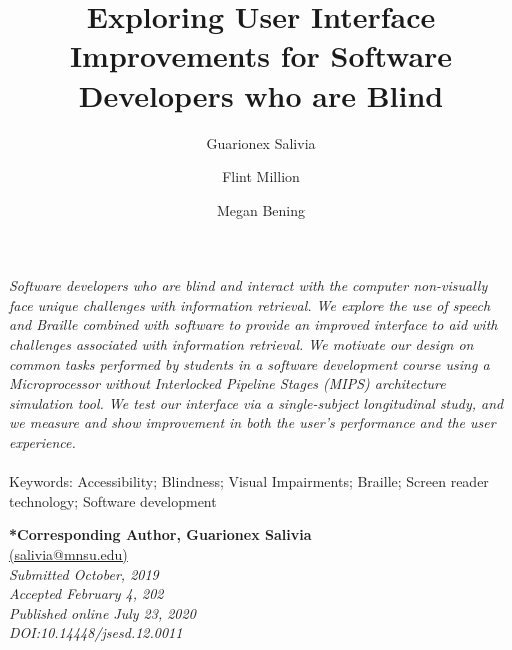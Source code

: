 \documentclass[11.5pt]{sig-alternate} %
\makeatletter
\let\oldabstract\abstract
\let\oldendabstract\endabstract
\renewenvironment{abstract} %
{\renewenvironment{quotation}%
               {\list{}{\addtolength{\leftmargin}{1em} %
                        \listparindent 1.5em%
                        \itemindent    \listparindent%
                        \rightmargin   \leftmargin%
                        \parsep        \z@ \@plus\p@}%
                \item\relax}%
               {\endlist}%
\oldabstract}
{\oldendabstract}
\makeatother
\begin{document}
\title{Exploring User Interface Improvements for Software Developers who are Blind}

\author[1]{\large \color{blue}Guarionex Salivia}
\author[1]{\large \color{blue}Flint Million}
\author[1]{\large \color{blue}Megan Bening}


\toappear{}
\maketitle
\begin{@twocolumnfalse} 
\begin{abstract}
\item 
\textit {Software developers who are blind and interact with the computer non-visually face unique challenges with information retrieval. We explore the use of speech and Braille combined with software to provide an improved interface to aid with challenges associated with information retrieval. We motivate our design on common tasks performed by students in a software development course using a Microprocessor without Interlocked Pipeline Stages (MIPS) architecture simulation tool. We test our interface via a single-subject longitudinal study, and we measure and show improvement in both the user’s performance and the user experience.}
\\ \\
Keywords: Accessibility; Blindness; Visual Impairments; Braille; Screen reader technology; Software development
\end{abstract}
\end{@twocolumnfalse}


\textbf{*Corresponding Author, Guarionex Salivia}\\
\href{mailto:  salivia@mnsu.edu}{(salivia@mnsu.edu)} \\
\textit{Submitted  October, 2019}\\
\textit{Accepted February 4, 202} \\
\textit{Published online July 23, 2020} \\
\textit{DOI:10.14448/jsesd.12.0011} \\
\pagebreak
\clearpage
\end{document}
